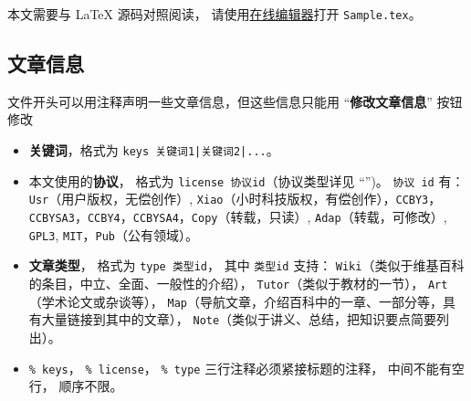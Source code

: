 
\begin{issues}
\issueDraft       %
\issueTODO        %
\issueMissDepend  %
\issueAbstract    %
\issueNeedCite    %
\issueAi          %
\issueAiRaw       %
\end{issues}


本文需要与 LaTeX 源码对照阅读， 请使用\href{https://wuli.wiki/editor}{在线编辑器}打开 \verb`Sample.tex`。

\subsection{文章信息}\label{sub_Sample_1}
文件开头可以用注释声明一些文章信息，但这些信息只能用 “\textbf{修改文章信息}” 按钮修改
\begin{itemize}
\item \textbf{关键词}，格式为 \verb`keys 关键词1|关键词2|...`。
\item 本文使用的\textbf{协议}， 格式为 \verb|license 协议id|（协议类型详见 “”)。 \verb|协议 id| 有： \verb|Usr|（用户版权，无偿创作）, \verb|Xiao|（小时科技版权，有偿创作），\verb|CCBY3|，\verb|CCBYSA3|，\verb|CCBY4|，\verb|CCBYSA4|，\verb|Copy|（转载，只读）, \verb|Adap|（转载，可修改）, \verb|GPL3|, \verb|MIT|，\verb|Pub|（公有领域）。
\item \textbf{文章类型}， 格式为 \verb|type 类型id|， 其中 \verb|类型id| 支持： \verb|Wiki|（类似于维基百科的条目，中立、全面、一般性的介绍）， \verb|Tutor|（类似于教材的一节）， \verb|Art|（学术论文或杂谈等）， \verb|Map|（导航文章，介绍百科中的一章、一部分等，具有大量链接到其中的文章）， \verb|Note|（类似于讲义、总结，把知识要点简要列出）。
\item \verb|% keys|， \verb|% license|， \verb|% type| 三行注释必须紧接标题的注释， 中间不能有空行， 顺序不限。
\end{itemize}

